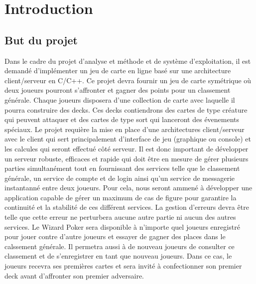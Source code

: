 \documentclass[11pt,a4paper]{article}
\begin{document}
    
    \pagestyle{empty}
\tableofcontents
\newpage
\pagestyle{fancy}

\setcounter{page}{1}

\section{Introduction}
\label{sec:intro}

\subsection{But du projet}
\label{sec:but}

Dans le cadre du projet d'analyse et méthode et de système d'exploitation, il est demandé d'implémenter un jeu de carte en ligne basé sur une architecture client/serveur en C/C++.
\medbreak
Ce projet devra fournir un jeu de carte symétrique où deux joueurs pourront s'affronter et gagner des points pour un classement générale. Chaque joueurs disposera d'une collection de carte avec laquelle il pourra construire des decks. Ces decks contiendrons des cartes de type créature qui peuvent attaquer et des cartes de type sort qui lanceront des évenements spéciaux.
\medbreak
Le projet requière la mise en place d'une architectures client/serveur avec le client qui sert principalement d'interface de jeu (graphique ou console) et les calcules qui seront effectué côté serveur. Il est donc important de développer un serveur robuste, efficaces et rapide qui doit être en mesure de gérer plusieurs parties simultanément tout en fournissant des services telle que le classement générale, un service de compte et de login ainsi qu'un service de messagerie instantanné entre deux joueurs. Pour cela, nous seront ammené à développer une application capable de gérer un maximum de cas de figure pour garantire la continuité et la stabilité de ces différent services. La gestion d'erreurs devra être telle que cette erreur ne perturbera aucune autre partie ni aucun des autres services.
\medbreak
Le Wizard Poker sera disponible à n'importe quel joueurs enregistré pour jouer contre d'autre joueurs et essayer de gagner des places dans le calssement générale. Il permetra aussi à de nouveau joueurs de consulter ce classement et de s'enregistrer en tant que nouveau joueurs. Dans ce cas, le joueurs recevra ses premières cartes et sera invité à confectionner son premier deck avant d'affronter son premier adversaire.

\end{document}
